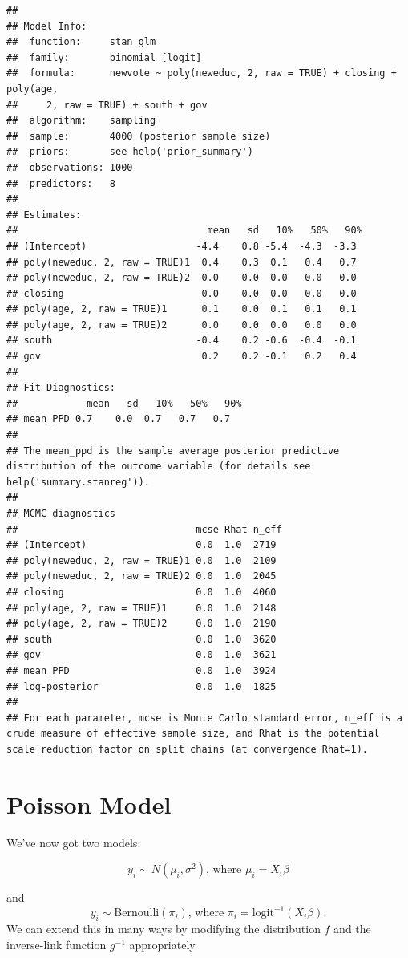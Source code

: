 \documentclass[
]{book}
\begin{document}
\begin{verbatim}
## 
## Model Info:
##  function:     stan_glm
##  family:       binomial [logit]
##  formula:      newvote ~ poly(neweduc, 2, raw = TRUE) + closing + poly(age, 
##     2, raw = TRUE) + south + gov
##  algorithm:    sampling
##  sample:       4000 (posterior sample size)
##  priors:       see help('prior_summary')
##  observations: 1000
##  predictors:   8
## 
## Estimates:
##                                 mean   sd   10%   50%   90%
## (Intercept)                   -4.4    0.8 -5.4  -4.3  -3.3 
## poly(neweduc, 2, raw = TRUE)1  0.4    0.3  0.1   0.4   0.7 
## poly(neweduc, 2, raw = TRUE)2  0.0    0.0  0.0   0.0   0.0 
## closing                        0.0    0.0  0.0   0.0   0.0 
## poly(age, 2, raw = TRUE)1      0.1    0.0  0.1   0.1   0.1 
## poly(age, 2, raw = TRUE)2      0.0    0.0  0.0   0.0   0.0 
## south                         -0.4    0.2 -0.6  -0.4  -0.1 
## gov                            0.2    0.2 -0.1   0.2   0.4 
## 
## Fit Diagnostics:
##            mean   sd   10%   50%   90%
## mean_PPD 0.7    0.0  0.7   0.7   0.7  
## 
## The mean_ppd is the sample average posterior predictive distribution of the outcome variable (for details see help('summary.stanreg')).
## 
## MCMC diagnostics
##                               mcse Rhat n_eff
## (Intercept)                   0.0  1.0  2719 
## poly(neweduc, 2, raw = TRUE)1 0.0  1.0  2109 
## poly(neweduc, 2, raw = TRUE)2 0.0  1.0  2045 
## closing                       0.0  1.0  4060 
## poly(age, 2, raw = TRUE)1     0.0  1.0  2148 
## poly(age, 2, raw = TRUE)2     0.0  1.0  2190 
## south                         0.0  1.0  3620 
## gov                           0.0  1.0  3621 
## mean_PPD                      0.0  1.0  3924 
## log-posterior                 0.0  1.0  1825 
## 
## For each parameter, mcse is Monte Carlo standard error, n_eff is a crude measure of effective sample size, and Rhat is the potential scale reduction factor on split chains (at convergence Rhat=1).
\end{verbatim}

\hypertarget{poisson-model}{%
\section{Poisson Model}\label{poisson-model}}

We've now got two models:

\[
y_i \sim N(\mu_i, \sigma^2)\text{, where } \mu_i = X_i\beta
\]

and \[
y_i \sim \text{Bernoulli}(\pi_i)\text{, where } \pi_i = \text{logit}^{-1}(X_i\beta).
\] We can extend this in many ways by modifying the distribution \(f\)
and the inverse-link function \(g^{-1}\) appropriately.
\end{document}
